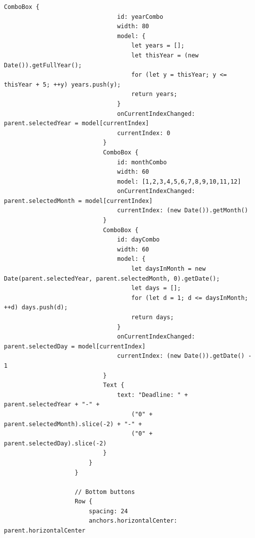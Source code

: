 \documentclass{report}
\begin{document}
\begin{lstlisting}[style=qmlstyle]
                            ComboBox {
                                id: yearCombo
                                width: 80
                                model: {
                                    let years = [];
                                    let thisYear = (new Date()).getFullYear();
                                    for (let y = thisYear; y <= thisYear + 5; ++y) years.push(y);
                                    return years;
                                }
                                onCurrentIndexChanged: parent.selectedYear = model[currentIndex]
                                currentIndex: 0
                            }
                            ComboBox {
                                id: monthCombo
                                width: 60
                                model: [1,2,3,4,5,6,7,8,9,10,11,12]
                                onCurrentIndexChanged: parent.selectedMonth = model[currentIndex]
                                currentIndex: (new Date()).getMonth()
                            }
                            ComboBox {
                                id: dayCombo
                                width: 60
                                model: {
                                    let daysInMonth = new Date(parent.selectedYear, parent.selectedMonth, 0).getDate();
                                    let days = [];
                                    for (let d = 1; d <= daysInMonth; ++d) days.push(d);
                                    return days;
                                }
                                onCurrentIndexChanged: parent.selectedDay = model[currentIndex]
                                currentIndex: (new Date()).getDate() - 1
                            }
                            Text {
                                text: "Deadline: " + parent.selectedYear + "-" +
                                    ("0" + parent.selectedMonth).slice(-2) + "-" +
                                    ("0" + parent.selectedDay).slice(-2)
                            }
                        }
                    }
    
                    // Bottom buttons
                    Row {
                        spacing: 24
                        anchors.horizontalCenter: parent.horizontalCenter
    

\end{lstlisting}
\end{document}
